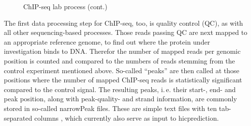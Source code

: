 \begin{wrapfigure}[14]{r}{0.3\textwidth}
 \caption{ChIP-seq lab process (cont.)}
 \label{fig:intro:chipseq-lab2}
\end{wrapfigure}
The first data processing step for ChIP-seq, too, is quality control (QC), as with all other sequencing-based processes. 
Those reads passing QC are next mapped to an appropriate reference genome, 
to find out where the protein under investigation binds to DNA.
Therefor the number of mapped reads per genomic position is counted and compared 
to the numbers of reads stemming from the control experiment mentioned above. 
So-called ``peaks'' are then called at those positions where the number of mapped ChIP-seq reads is
statistically significant compared to the control signal. 
The resulting peaks, i.\,e. their start-, end- and peak position, 
along with peak-quality- and strand information, 
are commonly stored in so-called narrowPeak files.
These are simple text files with ten tab-separated columns \cite{UniCaliforniaSantaCruz2020}, which currently also serve as input to hicprediction.


